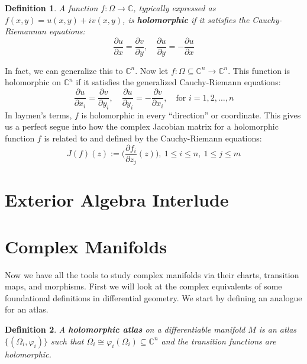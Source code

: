 \documentclass[12pt, letterpaper]{article}
\newtheorem{definition}{Definition}[section]
\newcommand{\C}{\mathbb{C}}
\newcommand{\ten}[1]{\textnormal{\textbf{#1}}}
\begin{document}
\begin{definition}\label{3.2}
    A function $f: \Omega \to \C$, typically expressed as $f(x,y) = u(x,y) + iv(x,y)$,
    is \ten{holomorphic} if it satisfies the Cauchy-Riemannan
    equations:
    \begin{equation*}
        \dfrac{\partial u}{\partial x} = \dfrac{\partial v}{\partial y}, \quad
        \dfrac{\partial u}{\partial y} = - \dfrac{\partial u}{\partial x}
    \end{equation*}
\end{definition}
In fact, we can generalize this to $\C^n$. Now let $f: \Omega \subseteq \C^n \to
\C^n$. This function is holomorphic on $\C^n$ if it satisfies the generalized 
Cauchy-Riemann equations:
\begin{equation*}
    \dfrac{\partial u}{\partial x_i} = \dfrac{\partial v}{\partial y_i}, \quad 
    \dfrac{\partial u}{\partial y_i} = - \dfrac{\partial v}{\partial x_i},\quad
    \text{for } i = 1, 2, \hdots , n
\end{equation*} 
In laymen's terms, $f$ is holomorphic in every ``direction'' or coordinate. This
gives us a perfect segue into how the complex Jacobian matrix for a holomorphic function
$f$ is related to and defined by the Cauchy-Riemann equations:
\begin{equation*}
    J(f)(z):= \bigg(\dfrac{\partial f_i}{\partial z_j}(z)\bigg), \ 1 \leq i \leq n, \
    1 \leq j \leq m
\end{equation*}

\section{Exterior Algebra Interlude}

\section{Complex Manifolds}
Now we have all the tools to study complex manifolds via their charts, transition
maps, and morphisms. First we will look at the complex equivalents of some foundational
definitions in differential geometry. We start by defining an analogue for an atlas.

\begin{definition}
    A \ten{holomorphic atlas} on a differentiable manifold $M$ is an atlas
    $\{(\Omega_i, \varphi_i)\}$ such that $\Omega_i \cong \varphi_i(\Omega_i) \subseteq
    \C^n$ and the transition functions are holomorphic.
\end{definition}
\end{document}
